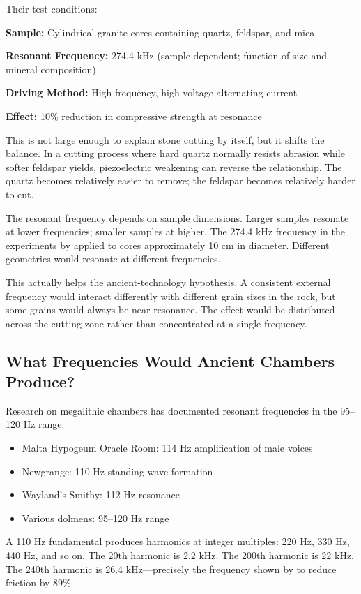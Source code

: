 \documentclass[11pt]{article}
\begin{document}
Their test conditions:

\textbf{Sample:} Cylindrical granite cores containing quartz, feldspar, and mica

\textbf{Resonant Frequency:} 274.4 kHz (sample-dependent; function of size and mineral composition)

\textbf{Driving Method:} High-frequency, high-voltage alternating current

\textbf{Effect:} 10\% reduction in compressive strength at resonance

This is not large enough to explain stone cutting by itself, but it shifts the balance. In a cutting process where hard quartz normally resists abrasion while softer feldspar yields, piezoelectric weakening can reverse the relationship. The quartz becomes relatively easier to remove; the feldspar becomes relatively harder to cut.

The resonant frequency depends on sample dimensions. Larger samples resonate at lower frequencies; smaller samples at higher. The 274.4 kHz frequency in the experiments by \citet{Saksala2023} applied to cores approximately 10 cm in diameter. Different geometries would resonate at different frequencies.

This actually helps the ancient-technology hypothesis. A consistent external frequency would interact differently with different grain sizes in the rock, but some grains would always be near resonance. The effect would be distributed across the cutting zone rather than concentrated at a single frequency.

\subsection{What Frequencies Would Ancient Chambers Produce?}

Research on megalithic chambers has documented resonant frequencies in the 95--120 Hz range:

\begin{itemize}
    \item Malta Hypogeum Oracle Room: 114 Hz amplification of male voices
    \item Newgrange: 110 Hz standing wave formation
    \item Wayland's Smithy: 112 Hz resonance
    \item Various dolmens: 95--120 Hz range
\end{itemize}

A 110 Hz fundamental produces harmonics at integer multiples: 220 Hz, 330 Hz, 440 Hz, and so on. The 20th harmonic is 2.2 kHz. The 200th harmonic is 22 kHz. The 240th harmonic is 26.4 kHz---precisely the frequency shown by \citet{Luo2024} to reduce friction by 89\%.
\end{document}
